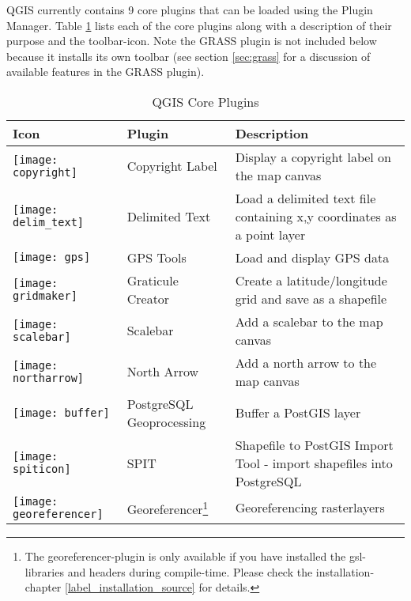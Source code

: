 QGIS currently contains 9 core plugins that can be loaded using the Plugin
Manager. Table \ref{tab:core_plugins} lists each of the core plugins along
with a description of their purpose and the toolbar-icon. 
Note the GRASS plugin is not included below
because it installs its own toolbar (see section \ref{sec:grass} for a
discussion of available features in the GRASS plugin).

\begin{minipage}{\textwidth}
\begin{table}[H]
\centering
\caption{QGIS Core Plugins}\label{tab:core_plugins}\medskip
\small
 \begin{tabular}{|l|l|p{4in}|}
\hline \textbf{Icon} & \textbf{Plugin} & \textbf{Description} \\
\hline 
\texttt{[image: copyright]} & Copyright Label \index{plugins!copyright}& Display a copyright label on the map canvas\\
\hline 
\texttt{[image: delim\_text]} & Delimited Text \index{plugins!delimited text}& Load a delimited text file containing x,y coordinates as a point layer \\
\hline 
\texttt{[image: gps]} & GPS Tools \index{plugins!gps}& Load and display GPS data \\
\hline 
\texttt{[image: gridmaker]} & Graticule Creator \index{plugins!graticule}& Create a latitude/longitude grid and save as a shapefile\\
\hline 
\texttt{[image: scalebar]} & Scalebar \index{plugins!scalebar}& Add a scalebar to the map canvas\\
\hline 
\texttt{[image: northarrow]}& North Arrow \index{plugins!north arrow}& Add a north arrow to the map canvas\\
\hline 
\texttt{[image: buffer]} & PostgreSQL Geoprocessing \index{plugins!geoprocessing}& Buffer a PostGIS layer \\
\hline 
\texttt{[image: spiticon]} & SPIT \index{plugins!SPIT}& Shapefile to PostGIS Import Tool - import shapefiles into PostgreSQL\\
\hline
\texttt{[image: georeferencer]} & Georeferencer\footnote{The georeferencer-plugin is only available if you have installed the gsl-libraries and headers during compile-time. Please check the installation-chapter \ref{label_installation_source} for details.} \index{plugin!Georeferencer} & Georeferencing rasterlayers \\
\hline
\end{tabular}
\end{table}
\end{minipage}

